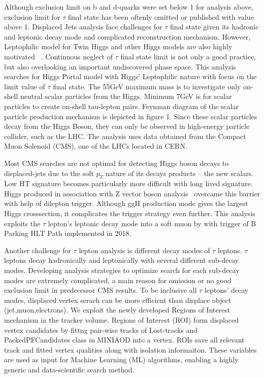 Although exclusion limit on b and d-quarks were set below 1 for analysis above, exclusion limit for $\tau$ final state has been oftenly omitted or published with value above 1.  
Displaced Jets analysis face challenges for $\tau$ final state given its hadronic and leptonic decay mode and complicated reconstruction mechanism. 
However, Leptophilic model for Twin Higgs and other Higgs models are also highly motivated ~\cite{Lepto}. Continuous neglect of $\tau$ final state limit is not only a good practice, but also overlooking an important undiscovered phase space. 
This analysis searches for Higgs Portal model with Higgs' Leptophilic nature with focus on the limit value of $\tau$ final state.
The 55GeV maximum mass is to investigate only on-shell neutral scalar particles from the Higgs. 
Minimum 7GeV is for scalar particles to create on-shell tau-lepton pairs.
Feynman diagram of the scalar particle production mechanism is depicted in figure 1.
Since these scalar particles decay from the Higgs Boson, they can only be observed in high-energy particle collider, such as the LHC. 
The analysis uses data obtained from the Compact Muon Solenoid (CMS), one of the LHCs located in CERN. 

Most CMS searches are not optimal for detecting Higgs boson decays to displaced-jets
due to the soft $p_T$ nature of its decays products -- the new scalars.
Low HT signature becomes particularly more difficult with long lived signature.
Higgs produced in association with Z vector boson analysis~\cite{ZHAN} overcame this barrier with help of dilepton trigger. 
Although ggH production mode gives the largest Higgs crosssection, it complicates the trigger strategy even further. 
This analysis exploits the $\tau$ lepton's leptonic decay mode into a soft muon by with trigger of B Parking HLT Path implemented in 2018.

Another challenge for $\tau$ lepton analysis is different decay modes of $\tau$ leptons. 
$\tau$ leptons decay hadronically and leptonically with several different sub-decay modes. 
Developing analysis strategies to optimize search for each sub-decay modes are extremely complicated, a main reason for omission or no good exclusion limit in predecessor CMS results.
To be inclusive all $\tau$ leptons' decay modes, displaced vertex serach can be more efficient than displace object (jet,muon,electrons). 
We exploit the newly developed Regions of Interest mechanism in the tracker volume. 
Regions of Interest (ROI) form displaced vertex candidates by fittng pair-wise tracks of Lost-tracks and PackedPFCandidates class in MINIAOD into a vertex. 
ROIs save all relevant track and fitted vertex qualities along with isolation informaiton.
These variables are used as input for Machine Learning (ML) algorithms, enabling a highly generic and data-scientific search method.


